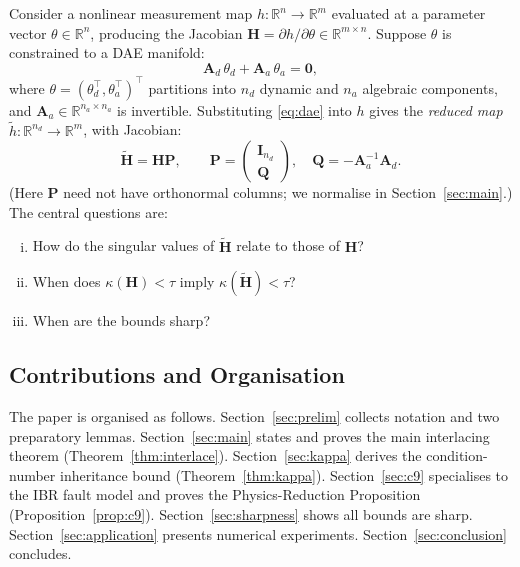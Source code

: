 \documentclass[11pt,a4paper]{article}
\theoremstyle{plain}
\theoremstyle{definition}
\theoremstyle{remark}
\newcommand{\bfH}{\mathbf{H}}
\newcommand{\bfHt}{\tilde{\mathbf{H}}}
\newcommand{\bfA}{\mathbf{A}}
\newcommand{\bfP}{\mathbf{P}}
\newcommand{\bfQ}{\mathbf{Q}}
\newcommand{\bfI}{\mathbf{I}}
\newcommand{\bfzero}{\mathbf{0}}
\begin{document}
Consider a nonlinear measurement map $h: \mathbb{R}^n \to \mathbb{R}^m$
evaluated at a parameter vector $\theta \in \mathbb{R}^n$, producing
the Jacobian $\bfH = \partial h/\partial\theta \in \mathbb{R}^{m \times n}$.
Suppose $\theta$ is constrained to a DAE manifold:
\begin{equation}
  \bfA_d\,\theta_d + \bfA_a\,\theta_a = \bfzero,
  \label{eq:dae}
\end{equation}
where $\theta = (\theta_d^\top, \theta_a^\top)^\top$ partitions
into $n_d$ dynamic and $n_a$ algebraic components, and
$\bfA_a \in \mathbb{R}^{n_a \times n_a}$ is invertible.
Substituting \eqref{eq:dae} into $h$ gives the \emph{reduced map}
$\tilde{h}: \mathbb{R}^{n_d} \to \mathbb{R}^m$, with Jacobian:
\begin{equation}
  \bfHt = \bfH\bfP, \qquad
  \bfP = \begin{pmatrix} \bfI_{n_d} \\ \bfQ \end{pmatrix},
  \quad \bfQ = -\bfA_a^{-1}\bfA_d.
  \label{eq:Htilde}
\end{equation}
(Here $\bfP$ need not have orthonormal columns; we normalise in
Section~\ref{sec:main}.)  The central questions are:
\begin{enumerate}[(i)]
  \item How do the singular values of $\bfHt$ relate to those of $\bfH$?
  \item When does $\kappa(\bfH) < \tau$ imply $\kappa(\bfHt) < \tau$?
  \item When are the bounds sharp?
\end{enumerate}

\subsection{Contributions and Organisation}

The paper is organised as follows.
Section~\ref{sec:prelim} collects notation and two preparatory lemmas.
Section~\ref{sec:main} states and proves the main interlacing theorem
(Theorem~\ref{thm:interlace}).
Section~\ref{sec:kappa} derives the condition-number inheritance bound
(Theorem~\ref{thm:kappa}).
Section~\ref{sec:c9} specialises to the IBR fault model and proves
the Physics-Reduction Proposition (Proposition~\ref{prop:c9}).
Section~\ref{sec:sharpness} shows all bounds are sharp.
Section~\ref{sec:application} presents numerical experiments.
Section~\ref{sec:conclusion} concludes.

\end{document}
